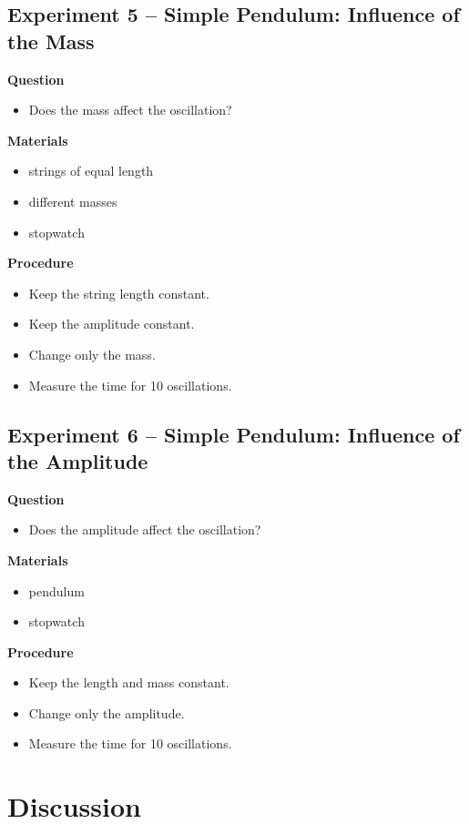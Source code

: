 \documentclass[a4paper,11pt]{article}
\begin{document}
\subsection*{Experiment 5 -- Simple Pendulum: Influence of the Mass}

\textbf{Question}
\begin{itemize}
\item Does the mass affect the oscillation?
\end{itemize}

\textbf{Materials}
\begin{itemize}
\item strings of equal length
\item different masses
\item stopwatch
\end{itemize}

\textbf{Procedure}
\begin{itemize}
\item Keep the string length constant.
\item Keep the amplitude constant.
\item Change only the mass.
\item Measure the time for 10 oscillations.
\end{itemize}

\subsection*{Experiment 6 -- Simple Pendulum: Influence of the Amplitude}

\textbf{Question}
\begin{itemize}
\item Does the amplitude affect the oscillation?
\end{itemize}

\textbf{Materials}
\begin{itemize}
\item pendulum
\item stopwatch
\end{itemize}

\textbf{Procedure}
\begin{itemize}
\item Keep the length and mass constant.
\item Change only the amplitude.
\item Measure the time for 10 oscillations.
\end{itemize}

\section{Discussion}
\end{document}
